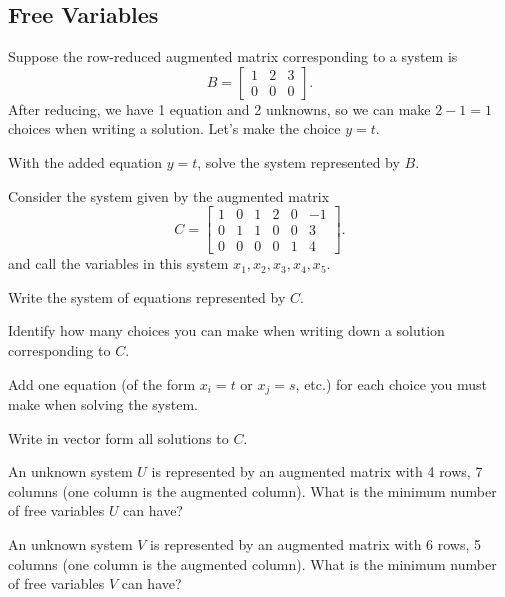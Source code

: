 \documentclass[14pt]{problemset}
\begin{document}
\newpage
\subsection*{Free Variables}
	\question
	Suppose the row-reduced augmented matrix corresponding to 
	a system is
	\[
		B=\left[\begin{array}{cc|c}
			1 & 2 & 3\\
			0 & 0 & 0
		\end{array}\right].
	\]
	After reducing, we have 1 equation and 2 unknowns, so we can make
	$2-1=1$ choices when writing a solution.  Let's make the
	choice $y=t$.
	
	\begin{parts}
		\item With the added equation $y=t$, solve the
		system represented by $B$.
	\end{parts}

	\question
	Consider the system given by the augmented matrix
	\[
		C=\left[\begin{array}{ccccc|c}
			1&0&1&2&0&-1\\
			0&1&1&0&0&3\\
			0&0&0&0&1&4
		\end{array}\right].
	\]
	and call the variables in this system $x_1,x_2,
	x_3,x_4,x_5$.

	\begin{parts}
		\item Write the system of equations represented by $C$.
		\item Identify how many choices you can make when writing
		down a solution corresponding to $C$.
		\item Add one equation (of the form $x_i=t$ or $x_j=s$, etc.)
		for each choice you must make when solving the system.
		\item Write in vector form all solutions to $C$.
	\end{parts}

	\question
	\begin{parts}
		\item An unknown system $U$ is represented by an augmented
			matrix with 4 rows, 7 columns (one column is
			the augmented column).  What is 
			the minimum number of
			free variables $U$ can have?
		\item An unknown system $V$ is represented by an augmented
			matrix with 6 rows, 5 columns (one column is the
			augmented column).  What is 
			the minimum number of
			free variables  $V$ can have?
	\end{parts}
	
\end{document}
